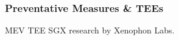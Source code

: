         \subsubsection{Preventative Measures \& TEEs}

            MEV TEE SGX research by Xenophon Labs.
            

